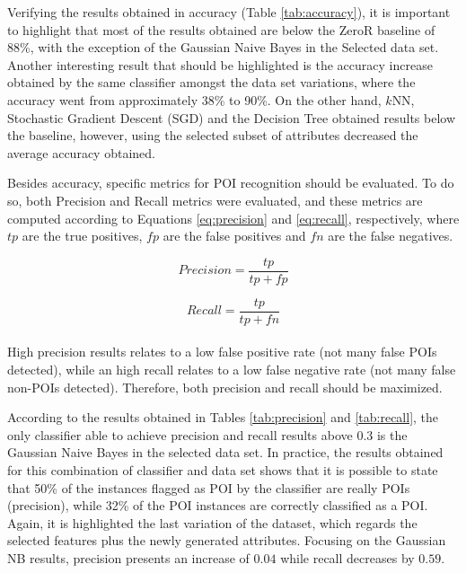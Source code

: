 \documentclass[11pt]{article}
\begin{document}
	
		Verifying the results obtained in accuracy (Table \ref{tab:accuracy}), it is important to highlight that most of the results obtained are below the ZeroR baseline of 88\%, with the exception of the Gaussian Naive Bayes in the Selected data set.
		Another interesting result that should be highlighted is the accuracy increase obtained by the same classifier amongst the data set variations, where the accuracy went from approximately 38\% to 90\%.
		On the other hand, $k$NN, Stochastic Gradient Descent (SGD) and the Decision Tree obtained results below the baseline, however, using the selected subset of attributes decreased the average accuracy obtained.
	
		Besides accuracy, specific metrics for POI recognition should be evaluated.
		To do so, both Precision and Recall metrics were evaluated, and these metrics are computed according to Equations \ref{eq:precision} and \ref{eq:recall}, respectively, where $tp$ are the true positives, $fp$ are the false positives and $fn$ are the false negatives.
		
				
		\begin{equation}
			Precision = \frac{tp}{tp + fp} 
			\label{eq:precision}
		\end{equation} 

		\begin{equation}
			Recall = \frac{tp}{tp + fn}
			\label{eq:recall}
		\end{equation} \\

		High precision results relates to a low false positive rate (not many false POIs detected), while an high recall relates to a low false negative rate (not many false non-POIs detected).
		Therefore, both precision and recall should be maximized.		
		
		According to the results obtained in Tables \ref{tab:precision} and \ref{tab:recall}, the only classifier able to achieve precision and recall results above 0.3 is the Gaussian Naive Bayes in the selected data set.
		In practice, the results obtained for this combination of classifier and data set shows that it is possible to state that 50\% of the instances flagged as POI by the classifier are really POIs (precision), while 32\% of the POI instances are correctly classified as a POI.
		Again, it is highlighted the last variation of the dataset, which regards the selected features plus the newly generated attributes.
		Focusing on the Gaussian NB results, precision presents an increase of $0.04$ while recall decreases by $0.59$.
\end{document}
